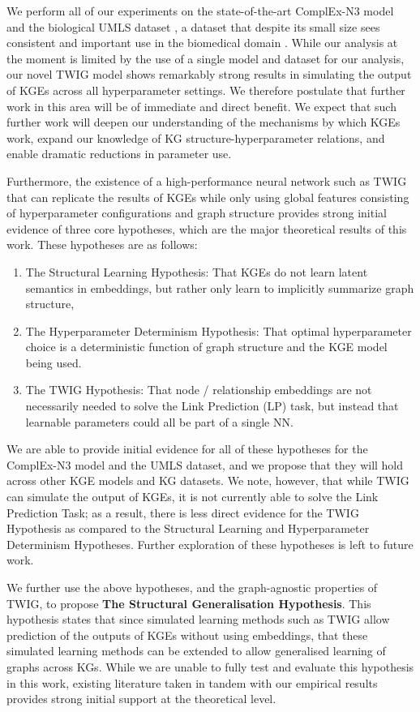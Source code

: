 We perform all of our experiments on the state-of-the-art ComplEx-N3 model \cite{complex-n3} and the biological UMLS dataset \cite{umls}, a dataset that despite its small size sees consistent and important use in the biomedical domain \cite{light-into-the-dark}. While our analysis at the moment is limited by the use of a single model and dataset for our analysis, our novel TWIG model shows remarkably strong results in simulating the output of KGEs across all hyperparameter settings. We therefore postulate that further work in this area will be of immediate and direct benefit. We expect that such further work will deepen our understanding of the mechanisms by which KGEs work, expand our knowledge of KG structure-hyperparameter relations, and enable dramatic reductions in parameter use.

Furthermore, the existence of a high-performance neural network such as TWIG that can replicate the results of KGEs while only using global features consisting of hyperparameter configurations and graph structure provides strong initial evidence of three core hypotheses, which are the major theoretical results of this work. These hypotheses are as follows: 
\begin{enumerate}
  \item The Structural Learning Hypothesis: That KGEs do not learn latent semantics in embeddings, but rather only learn to implicitly summarize graph structure,
  \item The Hyperparameter Determinism Hypothesis: That optimal hyperparameter choice is a deterministic function of graph structure and the KGE model being used.
  \item The TWIG Hypothesis: That node / relationship embeddings are not necessarily needed to solve the Link Prediction (LP) task, but instead that learnable parameters could all be part of a single NN.
\end{enumerate}

We are able to provide initial evidence for all of these hypotheses for the ComplEx-N3 model and the UMLS dataset, and we propose that they will hold across other KGE models and KG datasets. We note, however, that while TWIG can simulate the output of KGEs, it is not currently able to solve the Link Prediction Task; as a result, there is less direct evidence for the TWIG Hypothesis as compared to the Structural Learning and Hyperparameter Determinism Hypotheses. Further exploration of these hypotheses is left to future work.

We further use the above hypotheses, and the graph-agnostic properties of TWIG, to propose \textbf{The Structural Generalisation Hypothesis}. This hypothesis states that since simulated learning methods such as TWIG allow prediction of the outputs of KGEs without using embeddings, that these simulated learning methods can be extended to allow generalised learning of graphs across KGs. While we are unable to fully test and evaluate this hypothesis in this work, existing literature taken in tandem with our empirical results provides strong initial support at the theoretical level.

